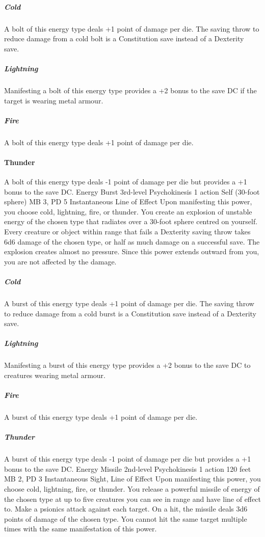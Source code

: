 \subparagraph{Cold} A bolt of this energy type deals +1 point
of damage per die. The saving throw to reduce damage from
a cold bolt is a Constitution save instead of a Dexterity
save.

\subparagraph{Lightning} Manifesting a bolt of this energy
type provides a +2 bonus to the save DC if the target is wearing
metal armour.

\subparagraph{Fire} A bolt of this energy type deals +1 point
of damage per die.

\paragraph{Thunder} A bolt of this energy type deals -1 point
of damage per die but provides a +1 bonus to the save DC.
\DndPowerHeader%
    {Energy Burst\label{pwr:energy_burst}}
    {3rd-level Psychokinesis}
    {1 action}
    {Self (30-foot sphere)}
    {MB 3, PD 5}
    {Instantaneous}
    {Line of Effect}
Upon manifesting this power, you choose cold,
lightning, fire, or thunder. You create an explosion of unstable
energy of the chosen type that radiates over a 30-foot sphere
centred on yourself. Every creature or object within range
that fails a Dexterity saving throw takes 6d6 damage of the
chosen type, or half as much damage on a successful save.
The explosion creates almost no pressure. Since this power
extends outward from you, you are not affected by the damage.

\subparagraph{Cold} A burst of this energy type deals +1 point
of damage per die. The saving throw to reduce damage from
a cold burst is a Constitution save instead of a Dexterity
save.

\subparagraph{Lightning} Manifesting a burst of this energy
type provides a +2 bonus to the save DC to creatures wearing
metal armour.

\subparagraph{Fire} A burst of this energy type deals +1 point
of damage per die.

\subparagraph{Thunder} A burst of this energy type deals -1
point of damage per die but provides a +1 bonus to the save
DC.
\DndPowerHeader%
    {Energy Missile\label{pwr:energy_missile}}
    {2nd-level Psychokinesis}
    {1 action}
    {120 feet}
    {MB 2, PD 3}
    {Instantaneous}
    {Sight, Line of Effect}
Upon manifesting this power, you choose cold,
lightning, fire, or thunder. You release a powerful missile
of energy of the chosen type at up to five creatures you can
see in range and have line of effect to. Make a psionics attack
against each target. On a hit, the missile deals 3d6 points
of damage of the chosen type. You cannot hit the same target
multiple times with the same manifestation of this power.

